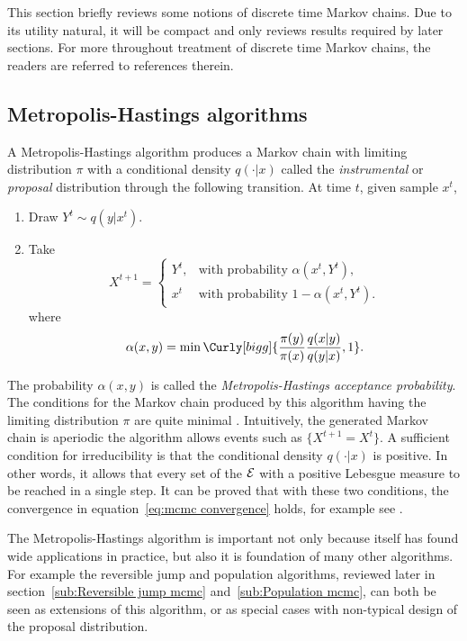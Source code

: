 This section briefly reviews some notions of discrete time Markov chains. Due
to its utility natural, it will be compact and only reviews results required
by later sections. For more throughout treatment of discrete time Markov
chains, the readers are referred to references therein.

\subsection{Metropolis-Hastings algorithms}
\label{sub:Metropolis-Hastings algorithms}

A Metropolis-Hastings algorithm produces a Markov chain with limiting
distribution $\pi$ with a conditional density $q(\cdot|x)$ called the
\emph{instrumental} or \emph{proposal} distribution through the following
transition. At time $t$, given sample $x^t$,
\begin{enumerate}
  \item Draw $Y^t \sim q(y|x^t)$.
  \item Take
    \begin{equation*}
      X^{t+1} =
      \begin{cases}
        Y^t, &\text{with probability } \alpha(x^t,Y^t),\\
        x^t  &\text{with probability } 1 - \alpha(x^t,Y^t).
      \end{cases}
    \end{equation*}
    where
    \begin{equation}
      \alpha(x,y) =
      \min\Curly[bigg]{\frac{\pi(y)}{\pi(x)}\frac{q(x|y)}{q(y|x)},1}.
    \end{equation}
\end{enumerate}
The probability $\alpha(x,y)$ is called the \emph{Metropolis-Hastings
  acceptance probability}. The conditions for the Markov chain produced by
this algorithm having the limiting distribution $\pi$ are quite minimal
\cite[][sec.~7.3.2]{Robert:2004tn}. Intuitively, the generated Markov chain is
aperiodic the algorithm allows events such as $\{X^{t+1} = X^t\}$. A
sufficient condition for irreducibility is that the conditional density
$q(\cdot|x)$ is positive. In other words, it allows that every set of the
$\mathcal{E}$ with a positive Lebesgue measure to be reached in a single step. It
can be proved that with these two conditions, the convergence in
equation~\eqref{eq:mcmc convergence} holds, for example see
\cite[][Theorem~7.4 and Corollary~7.5]{Robert:2004tn}.

The Metropolis-Hastings algorithm is important not only because itself has
found wide applications in practice, but also it is foundation of many other
algorithms. For example the reversible jump \mcmc and population \mcmc
algorithms, reviewed later in section~\ref{sub:Reversible jump mcmc}
and~\ref{sub:Population mcmc}, can both be seen as extensions of this
algorithm, or as special cases with non-typical design of the proposal
distribution.


